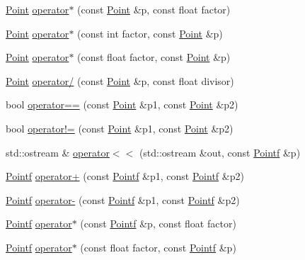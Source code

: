 \begin{DoxyCompactItemize}
\item 
\hyperlink{classprism_1_1_point}{Point} \hyperlink{namespaceprism_a96e41c0858ff4149eafa1bc878dabb7c}{operator$\ast$} (const \hyperlink{classprism_1_1_point}{Point} \&p, const float factor)
\item 
\hyperlink{classprism_1_1_point}{Point} \hyperlink{namespaceprism_aa46a547ddc48425588986b0840d026a4}{operator$\ast$} (const int factor, const \hyperlink{classprism_1_1_point}{Point} \&p)
\item 
\hyperlink{classprism_1_1_point}{Point} \hyperlink{namespaceprism_a1ec2671f1e6c155a79740a8556baecc0}{operator$\ast$} (const float factor, const \hyperlink{classprism_1_1_point}{Point} \&p)
\item 
\hyperlink{classprism_1_1_point}{Point} \hyperlink{namespaceprism_a5f73aee33931e5b9977da32e50d47c0e}{operator/} (const \hyperlink{classprism_1_1_point}{Point} \&p, const float divisor)
\item 
bool \hyperlink{namespaceprism_a739baa4e75c1ca83624d486eec1d45e9}{operator==} (const \hyperlink{classprism_1_1_point}{Point} \&p1, const \hyperlink{classprism_1_1_point}{Point} \&p2)
\item 
bool \hyperlink{namespaceprism_a75cab41d882d24ca064927f2390ef3a6}{operator!=} (const \hyperlink{classprism_1_1_point}{Point} \&p1, const \hyperlink{classprism_1_1_point}{Point} \&p2)
\item 
std\+::ostream \& \hyperlink{namespaceprism_acad408bf2576dfc62a573cb44aa895fb}{operator$<$$<$} (std\+::ostream \&out, const \hyperlink{classprism_1_1_pointf}{Pointf} \&p)
\item 
\hyperlink{classprism_1_1_pointf}{Pointf} \hyperlink{namespaceprism_a64243aa2d4cf6ddb70526aaeda396f82}{operator+} (const \hyperlink{classprism_1_1_pointf}{Pointf} \&p1, const \hyperlink{classprism_1_1_pointf}{Pointf} \&p2)
\item 
\hyperlink{classprism_1_1_pointf}{Pointf} \hyperlink{namespaceprism_a435d5c45d873875f2c5092d102eddb78}{operator-\/} (const \hyperlink{classprism_1_1_pointf}{Pointf} \&p1, const \hyperlink{classprism_1_1_pointf}{Pointf} \&p2)
\item 
\hyperlink{classprism_1_1_pointf}{Pointf} \hyperlink{namespaceprism_ade1984e58679ef4d8fcdd37726ee6483}{operator$\ast$} (const \hyperlink{classprism_1_1_pointf}{Pointf} \&p, const float factor)
\item 
\hyperlink{classprism_1_1_pointf}{Pointf} \hyperlink{namespaceprism_a409aa6b61b79f029d78f6d4c3aba2df5}{operator$\ast$} (const float factor, const \hyperlink{classprism_1_1_pointf}{Pointf} \&p)

\end{DoxyCompactItemize}
